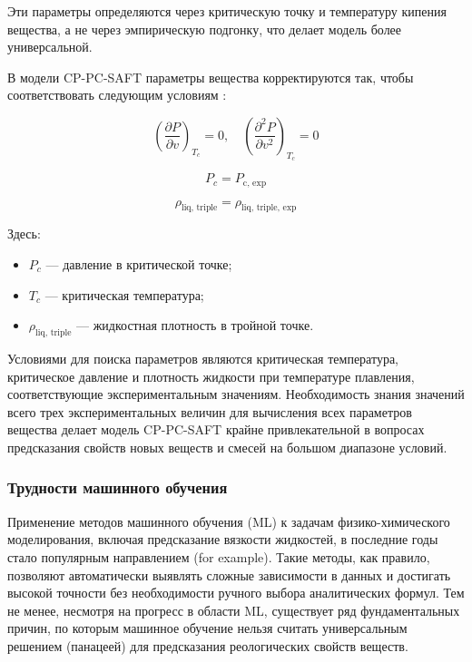 \documentclass[a4paper,12pt]{article}
\begin{document}
Эти параметры определяются через критическую точку и температуру кипения вещества, а не через эмпирическую подгонку, что делает модель более универсальной.

В модели CP-PC-SAFT параметры вещества корректируются так, чтобы соответствовать следующим условиям \cite{polishuk2014standardized}:

\begin{equation}
\left( \frac{\partial P}{\partial v} \right)_{T_c} = 0, \quad
\left( \frac{\partial^2 P}{\partial v^2} \right)_{T_c} = 0
\end{equation}

\begin{equation}
P_c = P_{\text{c, exp}}
\end{equation}

\begin{equation}
\rho_{\text{liq, triple}} = \rho_{\text{liq, triple, exp}}
\end{equation}

Здесь:
\begin{itemize}
    \item \( P_c \) — давление в критической точке;
    \item \( T_c \) — критическая температура;
    \item \( \rho_{\text{liq, triple}} \) — жидкостная плотность в тройной точке.
\end{itemize}

Условиями для поиска параметров являются критическая температура, критическое давление и плотность жидкости при температуре плавления, соответствующие экспериментальным значениям. Необходимость знания значений всего трех экспериментальных величин для вычисления всех параметров вещества делает модель CP-PC-SAFT крайне привлекательной в вопросах предсказания свойств новых веществ и смесей на большом диапазоне условий. 

\subsubsection{Трудности машинного обучения}

Применение методов машинного обучения (ML) к задачам физико-химического моделирования, включая предсказание вязкости жидкостей, в последние годы стало популярным направлением (for example). Такие методы, как правило, позволяют автоматически выявлять сложные зависимости в данных и достигать высокой точности без необходимости ручного выбора аналитических формул. Тем не менее, несмотря на прогресс в области ML, существует ряд фундаментальных причин, по которым машинное обучение нельзя считать универсальным решением (панацеей) для предсказания реологических свойств веществ.
\end{document}

